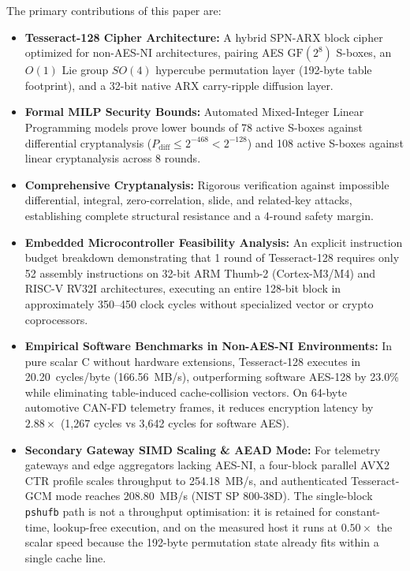 \documentclass[10pt,twocolumn]{article}
\begin{document}
The primary contributions of this paper are:
\begin{itemize}
    \item \textbf{Tesseract-128 Cipher Architecture:} A hybrid SPN-ARX block cipher optimized for non-AES-NI architectures, pairing AES $\text{GF}(2^8)$ S-boxes, an $O(1)$ Lie group $SO(4)$ hypercube permutation layer (192-byte table footprint), and a 32-bit native ARX carry-ripple diffusion layer.
    \item \textbf{Formal MILP Security Bounds:} Automated Mixed-Integer Linear Programming models prove lower bounds of 78 active S-boxes against differential cryptanalysis ($P_{\text{diff}} \le 2^{-468} < 2^{-128}$) and 108 active S-boxes against linear cryptanalysis across 8 rounds.
    \item \textbf{Comprehensive Cryptanalysis:} Rigorous verification against impossible differential, integral, zero-correlation, slide, and related-key attacks, establishing complete structural resistance and a 4-round safety margin.
    \item \textbf{Embedded Microcontroller Feasibility Analysis:} An explicit instruction budget breakdown demonstrating that 1 round of Tesseract-128 requires only 52 assembly instructions on 32-bit ARM Thumb-2 (Cortex-M3/M4) and RISC-V RV32I architectures, executing an entire 128-bit block in approximately 350--450 clock cycles without specialized vector or crypto coprocessors.
    \item \textbf{Empirical Software Benchmarks in Non-AES-NI Environments:} In pure scalar C without hardware extensions, Tesseract-128 executes in 20.20~cycles/byte (166.56~MB/s), outperforming software AES-128 by 23.0\% while eliminating table-induced cache-collision vectors. On 64-byte automotive CAN-FD telemetry frames, it reduces encryption latency by $2.88\times$ (1,267 cycles vs 3,642 cycles for software AES).
    \item \textbf{Secondary Gateway SIMD Scaling \& AEAD Mode:} For telemetry gateways and edge aggregators lacking AES-NI, a four-block parallel AVX2 CTR profile scales throughput to 254.18~MB/s, and authenticated Tesseract-GCM mode reaches 208.80~MB/s (NIST SP 800-38D). The single-block \texttt{pshufb} path is not a throughput optimisation: it is retained for constant-time, lookup-free execution, and on the measured host it runs at $0.50\times$ the scalar speed because the 192-byte permutation state already fits within a single cache line.
\end{itemize}
\end{document}

